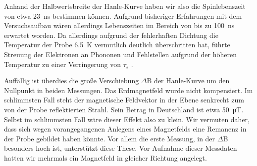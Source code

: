 \documentclass[11pt,twoside=true]{scrartcl}
\begin{document}
Anhand der Halbwertsbreite der Hanle-Kurve haben wir also die Spinlebenszeit
von etwa \SI{23}{\nano\second} bestimmen können. Aufgrund bisheriger
Erfahrungen mit dem Versuchsaufbau wären allerdings Lebenszeiten
im Bereich von bis zu \SI{100}{\nano\second} erwartet worden. Da allerdings
aufgrund der fehlerhaften Dichtung die Temperatur der Probe \SI{6.5}{\kelvin} 
vermutlich deutlich überschritten hat, führte Streuung der Elektronen an
Phononen und Fehlstellen aufgrund der höheren Temperatur zu einer Verringerung
von $\tau_s$ \cite{wu2010spin}.

Auffällig ist überdies die große Verschiebung
$\Delta$B der Hanle-Kurve um den Nullpunkt in beiden Messungen. 
%
Das Erdmagnetfeld wurde nicht kompensiert. Im schlimmsten Fall steht der
magnetische Feldvektor in der Ebene senkrecht zum von der Probe reflektierten
Strahl. Sein Betrag in Deutschland ist etwa \SI{50}{\micro\tesla}. Selbst im
schlimmsten Fall wäre dieser Effekt also zu klein.
%
Wir vermuten daher, dass sich wegen vorangegangenen Anlegens eines Magnetfelds
eine Remanenz in der Probe gebildet haben könnte. Vor allem die erste Messung,
in der $\Delta$B besonders hoch ist, unterstützt diese These. Vor Aufnahme
dieser Messdaten hatten wir mehrmals ein Magnetfeld in gleicher Richtung
angelegt.

\printbibliography
\end{document}
